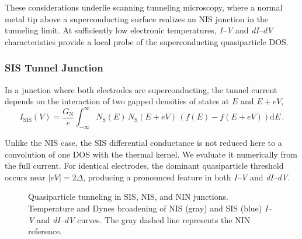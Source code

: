             These considerations underlie scanning tunneling microscopy, where a normal metal tip above a superconducting surface realizes an NIS junction in the tunneling limit. At sufficiently low electronic temperatures, \textit{I--V} and \textit{dI--dV} characteristics provide a local probe of the superconducting quasiparticle DOS.

        \subsubsection*{SIS Tunnel Junction}

            In a junction where both electrodes are superconducting, the tunnel current depends on the interaction of two gapped densities of states at $E$ and $E+eV$,
            \begin{equation}
                I_\mathrm{SIS}(V)
                    = \frac{G_\mathrm{N}}{e}
                    \int_{-\infty}^{\infty}
                        N_\mathrm{S}(E)\,
                        N_\mathrm{S}(E+eV)\,
                        \left(f(E) - f(E+eV)\right)
                    \mathrm{d}E\,.
            \end{equation}

            Unlike the NIS case, the SIS differential conductance is not reduced here to a convolution of one DOS with the thermal kernel. We evaluate it numerically from the full current. For identical electrodes, the dominant quasiparticle threshold occurs near $|eV|=2\Delta$, producing a pronounced feature in both \textit{I--V} and \textit{dI--dV}.

            \begin{figure}[t]
                \centering
                \hfill
                \hfill
                \caption{
                    Quasiparticle tunneling in SIS, NIS, and NIN junctions. Temperature and Dynes broadening of NIS (gray) and SIS (blue) \textit{I--V} and \textit{dI--dV} curves. The gray dashed line represents the NIN reference.
                    }
                \label{fig:micro:tunnel-iv-didv}
            \end{figure}

